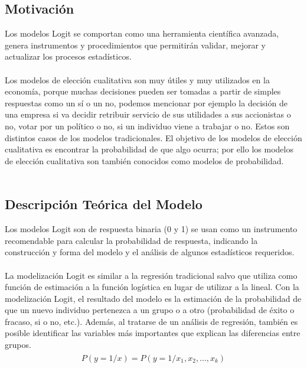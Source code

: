 \documentclass[11pt,fleqn]{book} %
\numberwithin{equation}{section} %
\numberwithin{figure}{section} %
\numberwithin{table}{section} %
\begin{document}
\newpage

\subsection{Motivación}

Los modelos Logit se comportan como una herramienta científica avanzada, genera instrumentos y procedimientos que permitirán validar, mejorar y actualizar los procesos estadísticos.
\\\\
Los modelos de elección cualitativa son muy útiles y muy utilizados en la economía, porque muchas decisiones pueden ser tomadas a partir de simples respuestas como un sí o un no, podemos mencionar por ejemplo la decisión de una empresa si va decidir retribuir servicio de sus utilidades a sus accionistas o no, votar por un político o no, si un individuo viene a trabajar o no. Estos son distintos casos de los modelos tradicionales. El objetivo de los modelos de elección cualitativa es encontrar la probabilidad de que algo ocurra; por ello los modelos de elección cualitativa son también conocidos como modelos de probabilidad.
\\\\

\subsection{Descripción Teórica del Modelo}

Los modelos Logit son de respuesta binaria (0 y 1) se usan como un instrumento recomendable para calcular la probabilidad de respuesta, indicando la construcción y forma del modelo y el análisis de algunos estadísticos requeridos.
\\\\
La modelización Logit es similar a la regresión tradicional salvo que utiliza como función de estimación a la función logística en lugar de utilizar a la lineal. Con la modelización Logit, el resultado del modelo es la estimación de la probabilidad de que un nuevo individuo pertenezca a un grupo o a otro (probabilidad de éxito o fracaso, si o no, etc.). Además, al tratarse de un análisis de regresión, también es posible identificar las variables más importantes que explican las diferencias entre grupos.
\begin{align} 
\begin{split}
P(y=1/x) = P(y=1/x_{1},x_{2},...,x_{k})
\end{split}					
\end{align}
\end{document}
